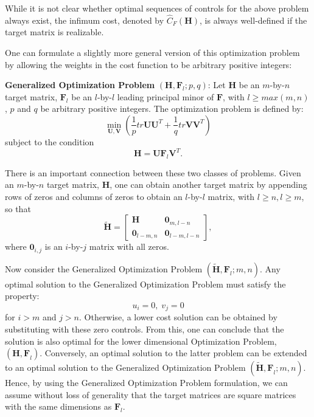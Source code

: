 \documentclass[12pt,onecolumn,draftcls]{IEEEtran}
\begin{document}
While it is not clear whether optimal sequences of controls for the above problem always exist, the infimum cost, denoted by $\hat{C}_F(\mathbf{H})$, is always well-defined if the target matrix is realizable.

One can formulate a slightly more general version of this optimization problem by allowing the
weights in the cost function to be arbitrary positive integers:

\noindent \textbf{Generalized Optimization Problem} $(\mathbf{H}, \mathbf{F}_l; p, q)$:
Let $\mathbf{H}$ be an $m$-by-$n$ target matrix,
$\mathbf{F}_l$ be an $l$-by-$l$ leading principal minor of  $\mathbf{F}$, with  $l \geq max(m,n)$,
$p$ and $q$ be arbitrary positive integers.  The optimization problem is defined by:
\begin{equation}
\min_{\mathbf{U},\mathbf{V}} \left( \frac{1}{p} tr \mathbf{U} \mathbf{U}^T +
\frac{1}{q}tr \mathbf{V} \mathbf{V}^T \right)
\end{equation}
subject to the condition
\begin{equation}
\mathbf{H}=\mathbf{U}\mathbf{F}_l\mathbf{V}^T.
\label{eq:P5}
\end{equation}

There is an important connection between these two classes of problems.
Given an $m$-by-$n$ target matrix, $\mathbf{H}$, one can obtain another target matrix by
appending rows of zeros and columns of zeros to obtain an $l$-by-$l$ matrix, with $l \geq n, l \geq m$, so that
\begin{equation}
\mathbf{\tilde{H}}=\left[
\begin{array}{ll}
\mathbf{H} & \mathbf{0}_{m,l-n}\\
\mathbf{0}_{l-m,n} & \mathbf{0}_{l-m,l-n}
\end{array}
\right],
\end{equation}
where $\mathbf{0}_{i,j}$ is an $i$-by-$j$ matrix with all zeros.

Now consider the Generalized Optimization Problem $(\mathbf{\tilde{H}, F}_l; m, n)$.
Any optimal solution to the Generalized Optimization Problem must satisfy the property:
\begin{equation}
u_i=0, \; v_j=0
\end{equation}
for $i>m$ and $j>n$.  Otherwise, a lower cost solution can be obtained by substituting with these
zero controls.   From this, one can conclude that the solution is also optimal for the lower
dimensional Optimization Problem, $(\mathbf{H,F}_l)$.
Conversely, an optimal solution to the latter problem can be extended to an optimal solution to
the Generalized Optimization Problem $(\mathbf{\tilde{H},F}_l;m,n)$.
Hence, by using the Generalized Optimization Problem formulation, we can assume without loss
of generality that the target matrices are square matrices with the same dimensions as $\mathbf{F}_l$.
\end{document}
